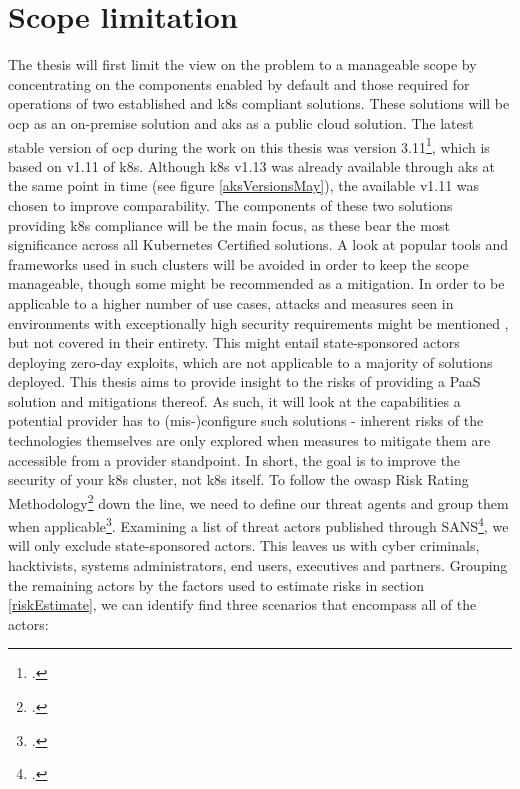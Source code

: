 \section{Scope limitation} \label{scopeLimit}

The thesis will first limit the view on the problem to a manageable scope by concentrating on the components enabled by default and those required for operations of two established and \gls{k8s} compliant solutions.
These solutions will be \gls{ocp} as an on-premise solution and \gls{aks} as a public cloud solution. 
The latest stable version of \gls{ocp} during the work on this thesis was version 3.11\footcite{ocpRelease}, which is based on v1.11 of \gls{k8s}.
Although \gls{k8s} v1.13 was already available through \gls{aks} at the same point in time (see figure \ref{aksVersionsMay}), the available v1.11 was chosen to improve comparability.
The components of these two solutions providing \gls{k8s} compliance will be the main focus, as these bear the most significance across all Kubernetes Certified solutions. 
A look at popular tools and frameworks used in such clusters will be avoided in order to keep the scope manageable, though some might be recommended as a mitigation.
In order to be applicable to a higher number of use cases, attacks and measures seen in environments with exceptionally high security requirements might be mentioned , but not  covered in their entirety. This might entail state-sponsored actors deploying zero-day exploits, which are not applicable to a majority of solutions deployed.
This thesis aims to provide insight to the risks of providing a PaaS solution and mitigations thereof. 
As such, it will look at the capabilities a potential provider has to (mis-)configure such solutions - inherent risks of the technologies themselves are only explored when measures to mitigate them are accessible from a provider standpoint. 
In short, the goal is to improve the security of your \gls{k8s} cluster, not \gls{k8s} itself.
To follow the \gls{owasp} Risk Rating Methodology\footcite{riskRating} down the line, we need to define our threat agents and group them when applicable\footcite[][, Section 'Define all possible threats']{threatModeling}. Examining a list of threat actors published through SANS\footcite[][p. 12 to 17]{sansThreatActors}, we will only exclude state-sponsored actors. This leaves us with cyber criminals, hacktivists, systems administrators, end users, executives and partners.
Grouping the remaining actors by the factors used to estimate risks in section \ref{riskEstimate}, we can identify find three scenarios that encompass all of the actors:
